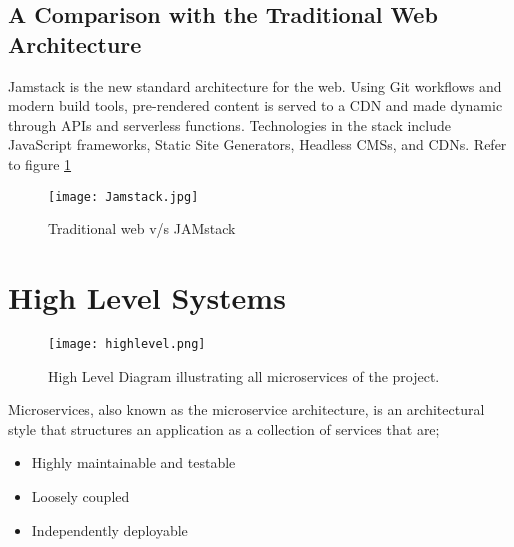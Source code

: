 \subsection{A Comparison with  the Traditional Web Architecture}

Jamstack is the new standard architecture for the web. Using Git workflows and modern build tools, pre-rendered content is served to a CDN and made dynamic through APIs and serverless functions. Technologies in the stack include JavaScript frameworks, 
Static Site Generators, Headless CMSs, and CDNs. Refer to figure \ref{fig:jamstack}

\begin{figure}[h!]
    \begin{center}
        \texttt{[image: Jamstack.jpg]}
    \end{center}
    \caption{Traditional web v/s JAMstack}
    \label{fig:jamstack}
\end{figure}

\section{High Level Systems}

\begin{figure}[h]
    \centering
    \texttt{[image: highlevel.png]}
    \caption{High Level Diagram illustrating all microservices of the project.}
    \label{fig:highlevel}
\end{figure}

Microservices, also known as the microservice architecture, is an architectural style that structures an 
application as a collection of services that are;
\begin{itemize}
    \item Highly maintainable and testable
    \item Loosely coupled
    \item Independently deployable
\end{itemize}

